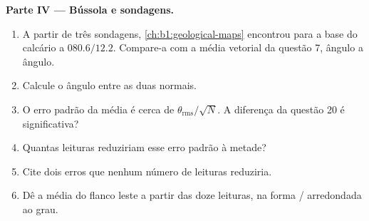 \begin{problem}
\medskip
\noindent\textbf{Parte IV --- Bússola e sondagens.}
\begin{enumerate}[resume]
  \item A partir de três sondagens, \cref{ch:b1:geological-maps} encontrou para a base do calcário a  $080.6/12.2$. Compare-a com a média vetorial da questão 7, ângulo a ângulo.
  \item Calcule o ângulo entre as duas normais.
  \item O erro padrão da  média é cerca de $\theta_{\text{rms}}/\sqrt N$. A diferença da questão 20 é significativa?
  \item Quantas leituras reduziriam esse erro padrão à metade?
  \item Cite dois erros que nenhum número de leituras reduziria.
  \item Dê a  média do flanco leste a partir das doze leituras, na forma / arredondada ao grau.
\end{enumerate}
\end{problem}
